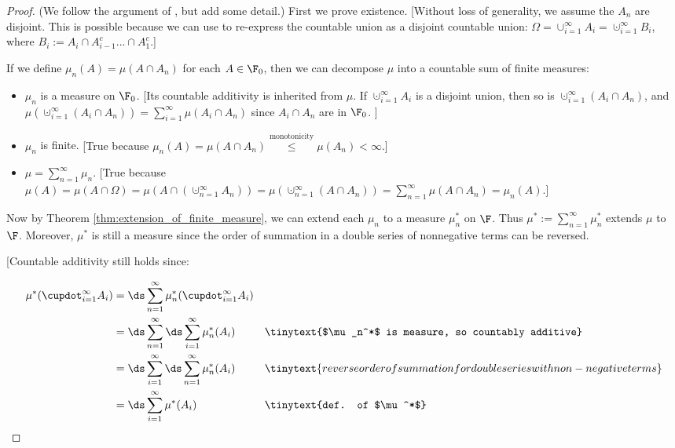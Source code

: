 \documentclass{article} %
\begin{document}
\begin{proof} (We follow the argument of \cite{ash2000probability}, but add some detail.) 
First we prove existence.  {\footnotesize [Without loss of generality, we assume the $A_n$ are disjoint.  This is possible because we can use  to re-express the countable union as a disjoint countable union:  $\Omega = \cup_{i=1}^\infty A_i = \cupdot_{i=1}^\infty B_i$, where $B_i := A_i \cap A_{i-1}^c ... \cap A_1^c$.]  } 

If we define $\mu_n(A)=\mu(A \cap A_n)$ for each $A \in \F_0$, then we can decompose $\mu$ into a countable sum of finite measures:
\begin{itemize}
\item $\mu_n$ is a measure on $\F_0$. {\footnotesize   [Its countable additivity is inherited from $\mu$. If $\cupdot_{i=1}^\infty A_i$ is a disjoint union, then so is $\cupdot_{i=1}^\infty (A_i \cap A_n)$, and $\mu( \cupdot_{i=1}^\infty (A_i \cap A_n)) = \sum_{i=1}^\infty \mu(A_i \cap A_n) $ since $A_i \cap A_n$ are in $\F_0$. ] }
\item $\mu_n$ is finite.  {\footnotesize  [True because $\mu_n(A) = \mu(A \cap A_n) \stackrel{\text{monotonicity}}{\leq} \mu(A_n) < \infty$.]	 }
\item  $\mu = \sum_{n=1}^\infty \mu_n$. {\footnotesize  [True because $\mu(A) = \mu(A \cap \Omega) = \mu(A \cap (\cupdot_{n=1}^\infty A_n)) =\mu(\cupdot_{n=1}^\infty (A \cap A_n)) = \sum_{n=1}^\infty \mu(A \cap A_n) = \mu_n (A). $] }
\end{itemize}
Now by Theorem \ref{thm:extension_of_finite_measure}, we can extend each $\mu_n$ to a measure $\mu_n^*$ on $\F$.   Thus $\mu^* := \sum_{n=1}^\infty \mu_n^*$ extends $\mu$ to $\F$.  Moreover, $\mu^*$ is still a measure since the order of summation in a double series of nonnegative terms can be reversed.  {\footnotesize   [Countable additivity still holds  since:

\begin{align*}
\mu^*(\cupdot_{i=1}^\infty A_i) &= \ds\sum_{n=1}^\infty \mu_n^* (\cupdot_{i=1}^\infty A_i) && \\ &= \ds\sum_{n=1}^\infty \ds\sum_{i=1}^\infty \mu_n^* (A_i) && \tinytext{$\mu_n^*$ is measure, so countably additive}\\
	&= \ds\sum_{i=1}^\infty \ds\sum_{n=1}^\infty \mu_n^*(A_i) && \tinytext{reverse order of summation for double series with non-negative terms} \\
	&= \ds\sum_{i=1}^\infty \mu^*(A_i) && \tinytext{def. of $\mu^*$}
\end{align*}

}
\end{proof}
\end{document}
